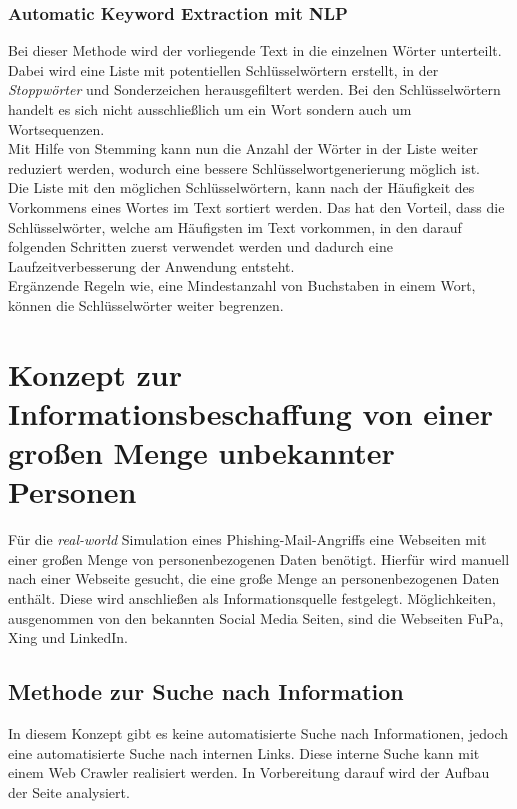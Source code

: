 		\subsubsection{Automatic Keyword Extraction mit NLP}
		\label{sec:Automatic Keyword Extraction}
		Bei dieser Methode wird der vorliegende Text in die einzelnen Wörter unterteilt. Dabei wird eine Liste mit potentiellen Schlüsselwörtern erstellt, in der \textit{Stoppwörter} und Sonderzeichen herausgefiltert werden. Bei den Schlüsselwörtern handelt es sich nicht ausschließlich um ein Wort sondern auch um Wortsequenzen.\\
		Mit Hilfe von Stemming kann nun die Anzahl der Wörter in der Liste weiter reduziert werden, wodurch eine bessere Schlüsselwortgenerierung möglich ist. \\
		Die Liste mit den möglichen Schlüsselwörtern, kann nach der Häufigkeit des Vorkommens eines Wortes im Text sortiert werden. Das hat den Vorteil, dass die Schlüsselwörter, welche am Häufigsten im Text vorkommen, in den darauf folgenden Schritten zuerst verwendet werden und dadurch eine Laufzeitverbesserung der Anwendung entsteht.\\
		Ergänzende Regeln wie, eine Mindestanzahl von Buchstaben in einem Wort, können die Schlüsselwörter weiter begrenzen. 

	
\section{Konzept zur Informationsbeschaffung von einer großen Menge unbekannter Personen}
Für die \textit{real-world} Simulation eines Phishing-Mail-Angriffs eine Webseiten mit einer großen Menge von personenbezogenen Daten benötigt. 	Hierfür wird manuell nach einer Webseite gesucht, die eine große Menge an personenbezogenen Daten enthält. Diese wird anschließen als Informationsquelle festgelegt. Möglichkeiten, ausgenommen von den bekannten Social Media Seiten, sind die Webseiten FuPa, Xing und LinkedIn.\\
	\subsection{Methode zur Suche nach Information}
	In diesem Konzept gibt es keine automatisierte Suche nach Informationen, jedoch eine automatisierte Suche nach internen Links. Diese interne Suche kann mit einem Web Crawler realisiert werden. In Vorbereitung darauf wird der Aufbau der Seite analysiert.\\
	
